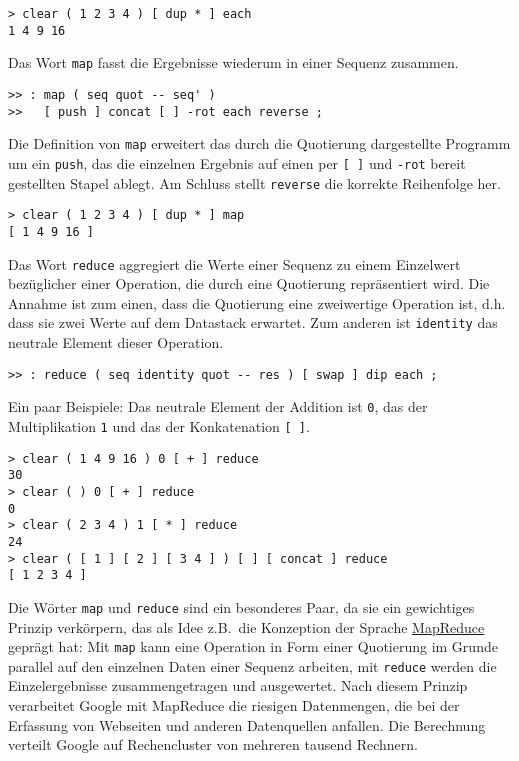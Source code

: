\begin{verbatim}
> clear ( 1 2 3 4 ) [ dup * ] each
1 4 9 16
\end{verbatim}

Das Wort \verb|map| fasst die Ergebnisse wiederum in einer Sequenz zusammen.

\begin{verbatim}
>> : map ( seq quot -- seq' )
>>   [ push ] concat [ ] -rot each reverse ;
\end{verbatim}

Die Definition von \verb|map| erweitert das durch die Quotierung dargestellte Programm um ein \verb|push|, das die einzelnen Ergebnis auf einen per \verb|[ ]| und \verb|-rot| bereit gestellten Stapel ablegt. Am Schluss stellt \verb|reverse| die korrekte Reihenfolge her.

\begin{verbatim}
> clear ( 1 2 3 4 ) [ dup * ] map
[ 1 4 9 16 ]
\end{verbatim}

Das Wort \verb|reduce| aggregiert die Werte einer Sequenz zu einem Einzelwert bezüglicher einer Operation, die durch eine Quotierung repräsentiert wird. Die Annahme ist zum einen, dass die Quotierung eine zweiwertige Operation ist, d.h. dass sie zwei Werte auf dem Datastack erwartet. Zum anderen ist \verb|identity| das neutrale Element dieser Operation.

\begin{verbatim}
>> : reduce ( seq identity quot -- res ) [ swap ] dip each ;
\end{verbatim}

Ein paar Beispiele: Das neutrale Element der Addition ist \verb|0|, das der Multiplikation \verb|1| und das der Konkatenation \verb|[ ]|.

\begin{verbatim}
> clear ( 1 4 9 16 ) 0 [ + ] reduce
30
> clear ( ) 0 [ + ] reduce
0
> clear ( 2 3 4 ) 1 [ * ] reduce
24
> clear ( [ 1 ] [ 2 ] [ 3 4 ] ) [ ] [ concat ] reduce
[ 1 2 3 4 ]
\end{verbatim}

Die Wörter \verb|map| und \verb|reduce| sind ein besonderes Paar, da sie ein gewichtiges Prinzip verkörpern, das als Idee z.B.\ die Konzeption der Sprache \href{http://de.wikipedia.org/wiki/MapReduce}{MapReduce} geprägt hat: Mit \verb|map| kann eine Operation in Form einer Quotierung im Grunde parallel auf den einzelnen Daten einer Sequenz arbeiten, mit \verb|reduce| werden die Einzelergebnisse zusammengetragen und ausgewertet. Nach diesem Prinzip verarbeitet Google mit MapReduce die riesigen Datenmengen, die bei der Erfassung von Webseiten und anderen Datenquellen anfallen. Die Berechnung verteilt Google auf Rechencluster von mehreren tausend Rechnern.

